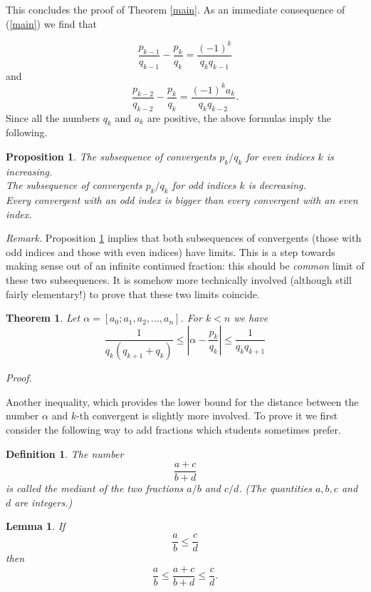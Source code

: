 \documentclass[12pt,letterpaper]{book}
\newtheorem{theorem}{Theorem}
\newtheorem{lemma}{Lemma}
\newtheorem{Def}{Definition}
\newtheorem{prop}{Proposition}
\begin{document}
This concludes the proof of Theorem \ref{main}. As an immediate
consequence of (\ref{main}) we find that

\begin{equation} \label{dif1}
\frac{p_{k-1}}{q_{k-1}} - \frac{p_k}{q_k} =
\frac{(-1)^k}{q_kq_{k-1}}
\end{equation}
and
$$
\frac{p_{k-2}}{q_{k-2}} - \frac{p_k}{q_k} =
\frac{(-1)^ka_k}{q_kq_{k-2}}.
$$
Since all the numbers $q_k$ and $a_k$ are positive, the above
formulas imply the following.

\begin{prop} \label{propord}
The subsequence of convergents $p_k/q_k$ for even indices $k$ is increasing. \\
The subsequence of convergents $p_k/q_k$ for odd indices $k$ is decreasing. \\
Every convergent with an odd index is bigger than every convergent
with an even index.
\end{prop}


{\sl Remark.} Proposition \ref{propord} implies that both
subsequences of convergents (those with odd indices and those with
even indices) have limits. This is a step towards making sense out
of an infinite continued fraction: this should be {\sl common} limit
of these two subsequences. It is somehow more technically involved
(although still fairly elementary!) to prove that these two limits
coincide.


\begin{theorem} \label{inequ}
Let $\alpha=[a_0;a_1,a_2,\ldots, a_n]$. For $k<n$ we have
$$
\frac{1}{q_k(q_{k+1}+q_k)} \leq \left\vert \alpha - \frac{p_k}{q_k}
\right\vert \leq \frac{1}{q_kq_{k+1}}
$$
\end{theorem}
{\sl Proof.}



Another inequality, which provides the lower bound for the distance
between the number $\alpha$ and $k$-th convergent is slightly more
involved. To prove it we first consider the following way to add
fractions which students sometimes prefer.

\begin{Def}
The number
$$
\frac{a+c}{b+d}
$$
is called the mediant of the two fractions $a/b$ and $c/d$. (The
quantities $a,b,c$ and $d$ are integers.)
\end{Def}

\begin{lemma} \label{medi}
If
$$
\frac{a}{b} \leq \frac{c}{d}
$$
then
$$
\frac{a}{b} \leq \frac{a+c}{b+d} \leq \frac{c}{d}.
$$
\end{lemma}
\end{document}
